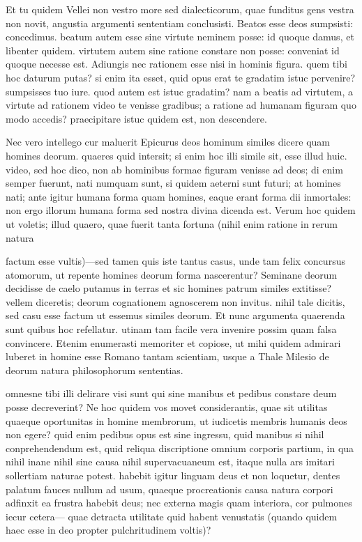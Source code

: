  Et tu quidem Vellei non vestro more sed dialecticorum, quae funditus gens vestra non novit, angustia argumenti sententiam conclusisti. Beatos esse deos sumpsisti: concedimus. beatum autem esse sine virtute neminem posse: id quoque damus, et libenter quidem. virtutem autem sine ratione constare non posse: conveniat id quoque necesse est. Adiungis nec rationem esse nisi in hominis figura. quem tibi hoc daturum putas? si enim ita esset, quid opus erat te gradatim istuc pervenire? sumpsisses tuo iure. quod autem est istuc gradatim? nam a beatis ad virtutem, a virtute ad rationem video te venisse gradibus; a ratione ad humanam figuram quo modo accedis? praecipitare istuc quidem est, non descendere.

 Nec vero intellego cur maluerit Epicurus deos hominum similes dicere quam homines deorum. quaeres quid intersit; si enim hoc illi simile sit, esse illud huic. video, sed hoc dico, non ab hominibus formae figuram venisse ad deos; di enim semper fuerunt, nati numquam sunt, si quidem aeterni sunt futuri; at homines nati; ante igitur humana forma quam homines, eaque erant forma dii inmortales: non ergo illorum humana forma sed nostra divina dicenda est. Verum hoc quidem ut voletis; illud quaero, quae fuerit tanta fortuna (nihil enim ratione in rerum natura

 factum esse vultis)—sed tamen quis iste tantus casus, unde tam felix concursus atomorum, ut repente homines deorum forma nascerentur? Seminane deorum decidisse de caelo putamus in terras et sic homines patrum similes extitisse? vellem diceretis; deorum cognationem agnoscerem non invitus. nihil tale dicitis, sed casu esse factum ut essemus similes deorum. Et nunc argumenta quaerenda sunt quibus hoc refellatur. utinam tam facile vera invenire possim quam falsa convincere. Etenim enumerasti memoriter et copiose, ut mihi quidem admirari luberet in homine esse Romano tantam scientiam, usque a Thale Milesio de deorum natura philosophorum sententias.

 omnesne tibi illi delirare visi sunt qui sine manibus et pedibus constare deum posse decreverint? Ne hoc quidem vos movet considerantis, quae sit utilitas quaeque oportunitas in homine membrorum, ut iudicetis membris humanis deos non egere? quid enim pedibus opus est sine ingressu, quid manibus si nihil conprehendendum est, quid reliqua discriptione omnium corporis partium, in qua nihil inane nihil sine causa nihil supervacuaneum est, itaque nulla ars imitari sollertiam naturae potest. habebit igitur linguam deus et non loquetur, dentes palatum fauces nullum ad usum, quaeque procreationis causa natura corpori adfinxit ea frustra habebit deus; nec externa magis quam interiora, cor pulmones iecur cetera— quae detracta utilitate quid habent venustatis (quando quidem haec esse in deo propter pulchritudinem voltis)?

